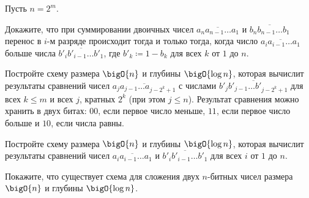 Пусть $n = 2^m$.
\begin{enumcyr}
    \item Докажите, что при суммировании двоичных чисел $\overline{a_n a_{n - 1} \dots a_1}$ и
        $\overline{b_{n} b_{n - 1} \dots b_1}$ перенос в $i$-м разряде происходит тогда и только тогда,
        когда число $\overline{a_i a_{i - 1} \dots a_1}$ больше числа $\overline{b'_{i} b'_{i - 1} \dots
        b'_{1}}$, где $b'_k \coloneqq 1 - b_k$ для всех $k$ от $1$ до $n$.
    \item Постройте схему размера $\bigO{n}$ и глубины $\bigO{\log n}$, которая вычислит результаты
        сравнений чисел $\overline{a_j a_{j - 1} \dots a_{j - 2^k + 1}}$ с числами
        $\overline{b'_j b'_{j - 1} \dots b'_{j - 2^k + 1}}$ для всех $k \le m$ и всех $j$, кратных $2^k$
        (при этом $j \le n$). Результат сравнения можно хранить в двух битах: $00$, если первое число
        меньше, $11$, если первое число больше и $10$, если числа равны.
    \item Постройте схему размера $\bigO{n}$ и глубины $\bigO{\log n}$, которая вычислит результаты
        сравнений чисел $\overline{a_i a_{i - 1} \dots a_1}$ и $\overline{b'_{i} b'_{i - 1} \dots
        b'_{1}}$ для всех $i$ от $1$ до $n$.
    \item Покажите, что существует схема для сложения двух $n$-битных чисел размера $\bigO{n}$ и глубины
        $\bigO{\log n}$.
\end{enumcyr}